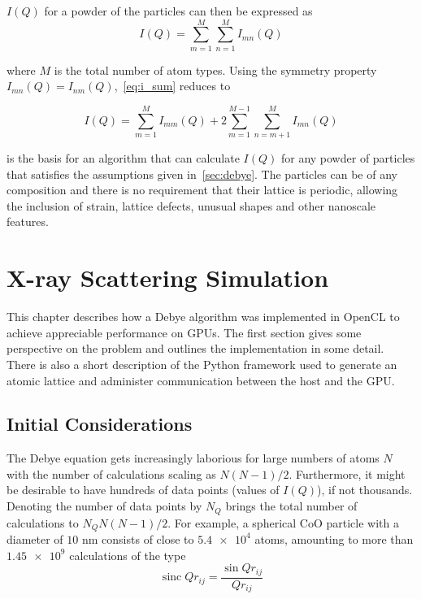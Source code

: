 \documentclass[11pt,twoside]{report}
\newcommand{\chem}[1]{\ensuremath{\mathrm{#1}}}
\begin{document}
\indent$I(Q)$ for a powder of the particles can then be expressed as
\begin{equation}
I(Q) = \sum_{m=1}^{M}\sum_{n=1}^{M} I_{mn}(Q) 
\label{eq:i_sum}
\end{equation} 

\noindent where $M$ is the total number of atom types. Using the symmetry property $I_{mn}(Q) = I_{nm}(Q)$,~\cref{eq:i_sum} reduces to

\begin{equation}
I(Q) = \sum_{m=1}^{M}I_{mm}(Q) +   2\sum_{m=1}^{M-1}\sum_{n=m+1}^{M} I_{mn}(Q)  
\label{eq:i_sum_symm}
\end{equation} 

\noindent {} is the basis for an algorithm that can calculate $I(Q)$ for any powder of particles that satisfies the assumptions given in~\cref{sec:debye}. The particles can be of any composition and there is no requirement that their lattice is periodic, allowing the inclusion of strain, lattice defects, unusual shapes and other nanoscale features. 



\chapter{X-ray Scattering Simulation}
This chapter describes how a Debye algorithm was implemented in OpenCL to achieve appreciable performance on GPUs. The first section gives some perspective on the problem and outlines the implementation in some detail.  There is also a short description of the Python framework used to  generate an atomic lattice and administer communication between the host and the GPU. 

\section{Initial Considerations\label{sec:initial_considerations}}
The Debye equation gets increasingly laborious for large numbers of atoms $N$ with the number of calculations scaling as $N(N-1)/2$. Furthermore, it might be desirable to have hundreds of data points (values of $I(Q)$), if not thousands. Denoting the number of data points by $N_{Q}$ brings the total number of calculations to $N_{Q}N(N-1)/2$. For example, a spherical \chem{CoO} particle with a diameter of $10$ nm consists of close to  $\num{5.4e4}$ atoms, amounting to more than $\num{1.45e9}$ calculations of the type
\begin{equation}
\operatorname{sinc}{Qr_{ij}} = \frac{\sin{Qr_{ij}}}{Qr_{ij}}
\label{eq:inner_calc}
\end{equation} 
\end{document}
